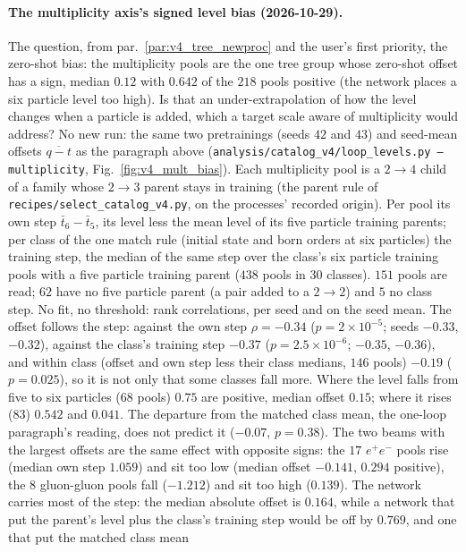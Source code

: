 \documentclass[11pt]{article}
\newcommand{\code}[1]{\texttt{#1}}
\begin{document}
\paragraph{The multiplicity axis's signed level bias (2026-10-29).}\label{par:v4_mult_bias} The question, from
par.~\ref{par:v4_tree_newproc} and the user's first priority, the zero-shot bias: the multiplicity pools are the one
tree group whose zero-shot offset has a sign, median $0.12$ with $0.642$ of the $218$ pools positive (the network
places a six particle level too high). Is that an under-extrapolation of how the level changes when a particle is
added, which a target scale aware of multiplicity would address? No new run: the same two pretrainings (seeds $42$
and $43$) and seed-mean offsets $\overline{q-t}$ as the paragraph above (\code{analysis/catalog\_v4/loop\_levels.py
--multiplicity}, Fig.~\ref{fig:v4_mult_bias}). Each multiplicity pool is a $2\to4$ child of a family whose $2\to3$
parent stays in training (the parent rule of \code{recipes/select\_catalog\_v4.py}, on the processes' recorded
origin). Per pool its own step $\bar t_6-\bar t_5$, its level less the mean level of its five particle training
parents; per class of the one match rule (initial state and born orders at six particles) the training step, the median
of the same step over the class's six particle training pools with a five particle training parent ($438$ pools in
$30$ classes). $151$ pools are read; $62$ have no five particle parent (a pair added to a $2\to2$) and $5$ no class
step. No fit, no threshold: rank correlations, per seed and on the seed mean. The offset follows the step: against the
own step $\rho=-0.34$ ($p=2\times10^{-5}$; seeds $-0.33$, $-0.32$), against the class's training step $-0.37$
($p=2.5\times10^{-6}$; $-0.35$, $-0.36$), and within class (offset and own step less their class medians, $146$ pools)
$-0.19$ ($p=0.025$), so it is not only that some classes fall more. Where the level falls from five to six particles
($68$ pools) $0.75$ are positive, median offset $0.15$; where it rises ($83$) $0.542$ and $0.041$. The departure from the
matched class mean, the one-loop paragraph's reading, does not predict it ($-0.07$, $p=0.38$). The two beams with the
largest offsets are the same effect with opposite signs: the $17$ $e^+e^-$ pools rise (median own step $1.059$) and sit
too low (median offset $-0.141$, $0.294$ positive), the $8$ gluon-gluon pools fall ($-1.212$) and sit too high
($0.139$). The network carries most of the step: the median absolute offset is $0.164$, while a network that put
the parent's level plus the class's training step would be off by $0.769$, and one that put the matched class mean
\end{document}
